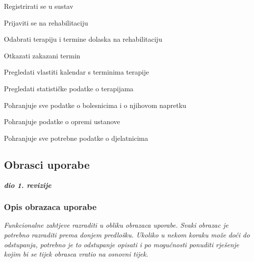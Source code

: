 \begin{packed_enum}
\begin{packed_enum}
	\end{packed_enum}

	\item {}

	\begin{packed_enum}

		\item Registrirati se u sustav
		\item Prijaviti se na rehabilitaciju
		\item Odabrati terapiju i termine dolaska na rehabilitaciju
		\item Otkazati zakazani termin
		\item Pregledati vlastiti kalendar s terminima terapije
		\item Pregledati statističke podatke o terapijama

	\end{packed_enum}

	\item {}

	\begin{packed_enum}

		\item Pohranjuje sve podatke o bolesnicima i o njihovom napretku
		\item Pohranjuje podatke o opremi ustanove
		\item Pohranjuje sve potrebne podatke o djelatnicima

	\end{packed_enum}
\end{packed_enum}

\eject



\subsection{Obrasci uporabe}

\textbf{\textit{dio 1. revizije}}

\subsubsection{Opis obrazaca uporabe}
\textit{Funkcionalne zahtjeve razraditi u obliku obrazaca uporabe. Svaki obrazac je potrebno razraditi prema donjem predlošku. Ukoliko u nekom koraku može doći do odstupanja, potrebno je to odstupanje opisati i po mogućnosti ponuditi rješenje kojim bi se tijek obrasca vratio na osnovni tijek.}
\vspace{2em} %

